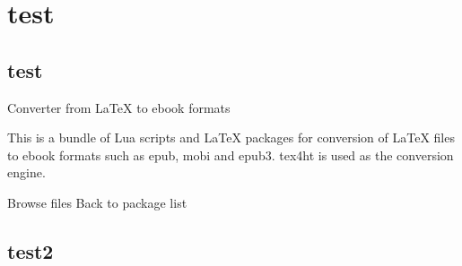 \documentclass[fontsize=12pt, paper=a4, pagesize=auto]{book}
\begin{document}
    \chapter{test}

    \section{test}

    Converter from LaTeX to ebook formats

    This is a bundle of Lua scripts and LaTeX packages for conversion of LaTeX files to 
    ebook formats such as epub, mobi and epub3. tex4ht is used as the conversion engine.
    
    Browse files
    Back to package list

    \section{test2}
\end{document}

